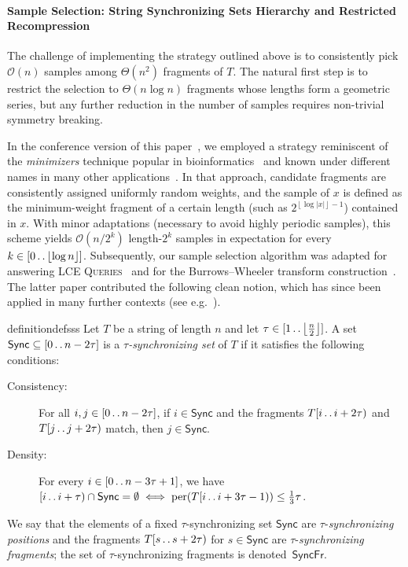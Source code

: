 \documentclass[a4paper]{article}
\theoremstyle{definition}
\theoremstyle{remark}
\newcommand{\LCEQ}{\textsc{LCE Queries}\xspace}
\newcommand{\floor}[1]{\left\lfloor #1 \right\rfloor}
\newcommand{\sub}{\subseteq}
\newcommand{\dd}{\mathinner{\ldotp\ldotp}}
\DeclareMathOperator{\per}{per}
\newcommand{\Oh}{\mathcal{O}}
\renewcommand{\S}{\mathsf{Sync}}
\renewcommand{\S}{\mathsf{Sync}}
\newcommand{\SF}{\mathsf{SyncFr}}
\begin{document}
\paragraph{Sample Selection: String Synchronizing Sets Hierarchy and Restricted Recompression}
The challenge of implementing the strategy outlined above is to consistently pick $\Oh(n)$ samples among $\Theta(n^2)$ fragments of $T$.
The natural first step is to restrict the selection to $\Theta(n\log n)$ fragments whose lengths form a geometric series,
but any further reduction in the number of samples requires non-trivial symmetry breaking.

In the conference version of this paper~\cite{DBLP:conf/soda/KociumakaRRW15}, we employed a strategy reminiscent of the \emph{minimizers} technique popular in bioinformatics~\cite{DBLP:journals/bioinformatics/RobertsHHMY04,Wood_2014,DBLP:journals/bioinformatics/DeorowiczKGD15,DBLP:journals/bioinformatics/Li18}
and known under different names in many other applications~\cite{DBLP:conf/sigmod/SchleimerWA03,DBLP:conf/icdm/SorokinaGWG06,DBLP:journals/ce/ButakovS09,DBLP:journals/tissec/PonecGWB10}.
In that approach, candidate fragments are consistently assigned uniformly random weights, and the sample of $x$ is defined as the minimum-weight fragment of a certain length (such as $2^{\floor{\log |x|}-1}$) contained in $x$. 
With minor adaptations (necessary to avoid highly periodic samples), this scheme yields $\Oh(n/2^{k})$ length-$2^k$ samples in expectation for every $k\in [0\dd \floor{\log n}]$.
Subsequently, our sample selection algorithm was adapted for answering \LCEQ~\cite{DBLP:conf/soda/BirenzwigeGP20,phd} and for the Burrows--Wheeler transform construction~\cite{Kempa2019}. The latter paper contributed the following clean notion, which has since been applied in many further contexts (see e.g.~\cite{DBLP:conf/focs/KempaK20,DBLP:conf/esa/Charalampopoulos21,DBLP:conf/stoc/KempaK22,DBLP:conf/soda/JinN23}).

\begin{restatable}{definition}{defsss}\label{def:sss}
  Let $T$ be a string of length $n$ and let $\tau \in [1\dd \floor{\frac{n}{2}}]$.
  A set $\S\sub [0\dd n-2\tau]$ is a
  \emph{$\tau$-synchronizing set} of $T$ if it satisfies the following conditions:
  \begin{description}
\item[Consistency:] For all $i,j\in [0\dd n-2\tau]$, if $i\in \S$ and the fragments $T[i\dd i+2\tau)$ and $T[j\dd j+2\tau)$ match, then $j\in \S$.
\item[Density:]
For every $i\in [0\dd n-3\tau+1]$, we have $[i\dd i+\tau)\cap \S = \emptyset\;\Longleftrightarrow\; \per(T[i\dd i+3\tau-1)) \le \tfrac13\tau$.
\end{description}
We say that the elements of a fixed $\tau$-synchronizing set $\S$ are $\tau$-\emph{synchronizing positions} and the fragments $T[s\dd s+2\tau)$ for $s\in \S$ are $\tau$-\emph{synchronizing fragments}; the set of $\tau$-synchronizing fragments is denoted~$\SF$.
\end{restatable}
\end{document}
